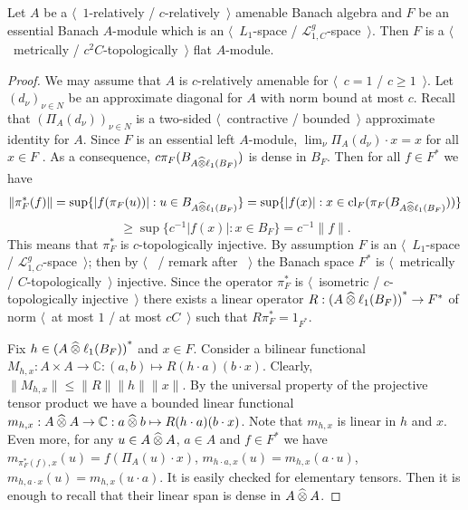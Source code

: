 \begin{proposition}\label{MetTopEssL1FlatModAoverAmenBanAlg} Let $A$ be a
$\langle$~$1$-relatively / $c$-relatively~$\rangle$ amenable Banach algebra and
$F$ be an essential Banach $A$-module which is an $\langle$~$L_1$-space /
$\mathscr{L}_{1,C}^g$-space~$\rangle$. Then $F$ is a $\langle$~metrically /
$c^2C$-topologically~$\rangle$ flat $A$-module.
\end{proposition}
\begin{proof} We may assume that $A$ is $c$-relatively amenable for
$\langle$~$c=1$ / $c\geq 1$~$\rangle$. Let ${(d_\nu)}_{\nu\in N}$ be an
approximate diagonal for $A$ with norm bound at most $c$. Recall that
${(\Pi_A(d_\nu))}_{\nu\in N}$ is a two-sided $\langle$~contractive /
bounded~$\rangle$ approximate identity for $A$. Since $F$ is an essential left
$A$-module, $\lim_{\nu}\Pi_A(d_\nu)\cdot x=x$ for all $x\in F$
\cite[proposition 0.3.15]{HelHomolBanTopAlg}. As a consequence,
$c\pi_F(B_{A\mathbin{\widehat{\otimes}}\ell_1(B_F)})$ is dense in $B_F$. Then for all $f\in F^*$
we have
\[
\lVert\pi_F^*(f)\rVert
=\sup \{|f(\pi_F(u))|:u\in B_{A\mathbin{\widehat{\otimes}}\ell_1(B_F)} \}
=\sup \{|f(x)|:x\in \operatorname{cl}_F(\pi_F(B_{A\mathbin{\widehat{\otimes}}\ell_1(B_F)})) \}
\]
\[
\geq\sup \{c^{-1}|f(x)|:x\in B_F \}=c^{-1}\lVert f\rVert.
\]
This means that $\pi_F^*$ is $c$-topologically injective. By assumption $F$ is
an $\langle$~$L_1$-space / $\mathscr{L}_{1,C}^g$-space~$\rangle$; then by
$\langle$~\cite[theorem 1]{GrothMetrProjFlatBanSp} / remark after
\cite[corollary 23.5(1)]{DefFloTensNorOpId}~$\rangle$ the Banach space $F^*$
is $\langle$~metrically / $C$-topologically~$\rangle$ injective. Since the operator
$\pi_F^*$ is $\langle$~isometric / $c$-topologically injective~$\rangle$
there exists a linear operator $R:{(A\mathbin{\widehat{\otimes}}\ell_1(B_F))}^*\to F^*$ of norm
$\langle$~at most $1$ / at most $cC$~$\rangle$ such that $R\pi_F^*=1_{F^*}$.

Fix $h\in {(A\mathbin{\widehat{\otimes}}\ell_1(B_F))}^*$ and $x\in F$. Consider a bilinear
functional $M_{h,x}:A\times A\to\mathbb{C}:(a,b)\mapsto R(h\cdot a)(b\cdot x)$.
Clearly, $\lVert M_{h,x}\rVert\leq\lVert R\rVert\lVert h\rVert\lVert x\rVert$. By
the universal property of the projective tensor product we have a bounded linear
functional 
$m_{h,x}:A\mathbin{\widehat{\otimes}} A\to\mathbb{C}:a\mathbin{\widehat{\otimes}} b\mapsto R(h\cdot a)(b\cdot x)$. 
Note that $m_{h,x}$ is linear in $h$ and $x$. Even more, for any
$u\in A\mathbin{\widehat{\otimes}} A$, $a\in A$ and $f\in F^*$ we have
$m_{\pi_F^*(f),x}(u)=f(\Pi_A(u)\cdot x)$, $m_{h\cdot a,x}(u)=m_{h,x}(a\cdot u)$,
$m_{h,a\cdot x}(u)=m_{h,x}(u\cdot a)$. It is easily checked for elementary tensors.
Then it is enough to recall that their linear span is dense in $A\mathbin{\widehat{\otimes}} A$.


\end{proof}
